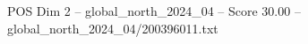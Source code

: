 \begin{textsample}{POS Dim 2 – global\_north\_2024\_04 – Score 30.00 – global\_north\_2024\_04/200396011.txt}
\end{textsample}

